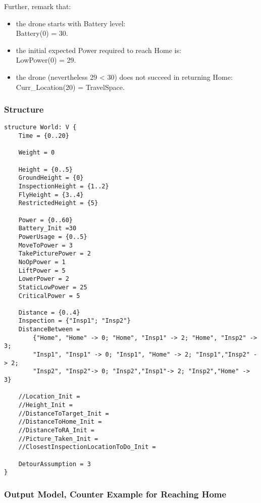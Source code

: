 \documentclass[12pt]{extarticle}
\begin{document}
Further, remark that:
\begin{itemize}
    \item the drone starts with Battery level:\\
    Battery(0) = 30.
    \item the initial expected Power required to reach Home is:\\
    LowPower(0) = 29.
    \item the drone (nevertheless 29 < 30) does not succeed in returning Home:\\
    Curr\_Location(20) = TravelSpace.
\end{itemize}
\subsubsection*{Structure}
\begin{lstlisting}[basicstyle=\tiny]
structure World: V {
    Time = {0..20}
    
    Weight = 0

    Height = {0..5}
    GroundHeight = {0}
    InspectionHeight = {1..2}
    FlyHeight = {3..4}
    RestrictedHeight = {5}
    
    Power = {0..60}
    Battery_Init =30
    PowerUsage = {0..5}
    MoveToPower = 3
    TakePicturePower = 2
    NoOpPower = 1
    LiftPower = 5
    LowerPower = 2
    StaticLowPower = 25
    CriticalPower = 5
    
    Distance = {0..4}
    Inspection = {"Insp1"; "Insp2"}
    DistanceBetween =
    	{"Home", "Home" -> 0; "Home", "Insp1" -> 2; "Home", "Insp2" -> 3;
        "Insp1", "Insp1" -> 0; "Insp1", "Home" -> 2; "Insp1","Insp2" -> 2;
    	"Insp2", "Insp2"-> 0; "Insp2","Insp1"-> 2; "Insp2","Home" -> 3}

    //Location_Init =
    //Height_Init = 
    //DistanceToTarget_Init =
    //DistanceToHome_Init =
    //DistanceToRA_Init =
    //Picture_Taken_Init =
    //ClosestInspectionLocationToDo_Init =
    
    DetourAssumption = 3
}
\end{lstlisting}

\subsubsection*{Output Model, Counter Example for Reaching Home}
\end{document}
